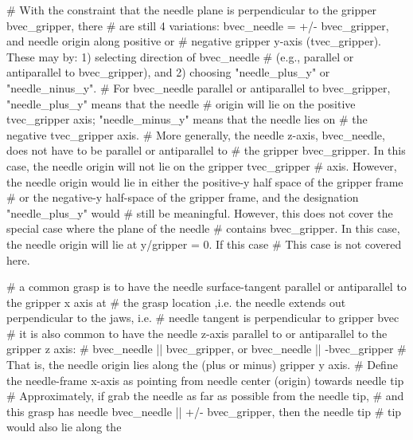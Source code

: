 \begin{DoxyVerb}
# With the constraint that the needle plane is perpendicular to the gripper bvec_gripper, there
# are still 4 variations: bvec_needle = +/- bvec_gripper, and needle origin along positive or
# negative gripper y-axis (tvec_gripper).  These may by: 1) selecting direction of bvec_needle
#  (e.g., parallel or antiparallel to bvec_gripper), and 2) choosing "needle_plus_y" or "needle_ninus_y".
# For bvec_needle parallel or antiparallel to bvec_gripper, "needle_plus_y" means that the needle 
# origin will lie on the positive tvec_gripper axis; "needle_minus_y" means that the needle lies on
# the negative tvec_gripper axis.
# More generally, the needle z-axis, bvec_needle, does not have to be parallel or antiparallel to
# the gripper bvec_gripper.  In this case, the needle origin will not lie on the gripper tvec_gripper
# axis.  However, the needle origin would lie in either the positive-y half space of the gripper frame
# or the negative-y half-space of the gripper frame, and the designation "needle_plus_y" would
# still be meaningful.  However, this does not cover the special case where the plane of the needle
# contains bvec_gripper.  In this case, the needle origin will lie at y/gripper = 0.  If this case
# This case is not covered here.


# a common grasp is to have the needle surface-tangent parallel or antiparallel to the gripper x axis at 
#  the grasp location ,i.e. the needle extends out perpendicular to the jaws, i.e.
#  needle tangent  is perpendicular to gripper bvec
# it is also common to have the needle z-axis parallel to or antiparallel to the gripper z axis:
# bvec_needle || bvec_gripper, or bvec_needle || -bvec_gripper
#  That is, the needle origin lies along the (plus or minus) gripper y axis.
# Define the needle-frame x-axis as pointing from needle center (origin) towards needle tip
# Approximately, if grab the needle as far as possible from the needle tip, 
# and this grasp has needle bvec_needle || +/- bvec_gripper, then the needle tip 
# tip would also lie along the\end{DoxyVerb}
 
